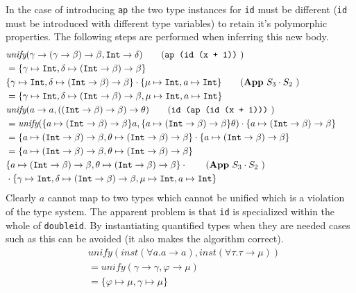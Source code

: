 \documentclass[11pt,oneside,a4paper]{report}
\begin{document}
\begin{exmp}
    In the case of introducing \texttt{ap} the two type instances for \texttt{id} must be different (\texttt{id} must be introduced with different type variables) to retain it's polymorphic properties.
    The following steps are performed when inferring this new body.
\begin{align}
    &\textit{unify}(\gamma \rightarrow (\gamma \rightarrow \beta) \rightarrow \beta, \texttt{Int} \rightarrow \delta) \tag{\texttt{ap (id (x + 1))} }\\
    & = \{ \gamma \mapsto \texttt{Int}, \delta \mapsto (\texttt{Int} \rightarrow \beta) \rightarrow \beta \} \tag*{}\\
    &\{ \gamma \mapsto \texttt{Int}, \delta \mapsto (\texttt{Int} \rightarrow \beta) \rightarrow \beta \} \cdot \{ \mu \mapsto \texttt{Int}, a \mapsto \texttt{Int} \} \tag{\textbf{App} $S_3 \cdot S_2$ }\\
    & = \{ \gamma \mapsto \texttt{Int}, \delta \mapsto (\texttt{Int} \rightarrow \beta) \rightarrow \beta, \mu \mapsto \texttt{Int}, a \mapsto \texttt{Int} \} \tag*{}\\
    &\textit{unify}(a \rightarrow a, ((\texttt{Int} \rightarrow \beta) \rightarrow \beta) \rightarrow \theta) \tag{\texttt{id (ap (id (x + 1)))} }\\
    &= \textit{unify}(
     \{ a \mapsto  (\texttt{Int} \rightarrow \beta) \rightarrow \beta \} a,
     \{ a \mapsto  (\texttt{Int} \rightarrow \beta) \rightarrow \beta\} \theta
    ) \cdot \{ a \mapsto  (\texttt{Int} \rightarrow \beta) \rightarrow \beta\} \tag*{}\\
    &= \{ a \mapsto (\texttt{Int} \rightarrow \beta) \rightarrow \beta, \theta \mapsto (\texttt{Int} \rightarrow \beta) \rightarrow \beta \} \cdot \{ a \mapsto (\texttt{Int} \rightarrow \beta) \rightarrow \beta\} \tag*{}\\
    &= \{ a \mapsto (\texttt{Int} \rightarrow \beta) \rightarrow \beta, \theta \mapsto (\texttt{Int} \rightarrow \beta) \rightarrow \beta \} \tag*{}\\
    &\{ a \mapsto (\texttt{Int} \rightarrow \beta) \rightarrow \beta, \theta \mapsto (\texttt{Int} \rightarrow \beta) \rightarrow \beta \} \cdot \tag{\textbf{App} $S_3 \cdot S_2$ }\\
    &\cdot \{ \gamma \mapsto \texttt{Int}, \delta \mapsto (\texttt{Int} \rightarrow \beta) \rightarrow \beta, \mu \mapsto \texttt{Int}, a \mapsto \texttt{Int} \} \tag*{}
\end{align}
    Clearly $a$ cannot map to two types which cannot be unified which is a violation of the type system.
    The apparent problem is that \texttt{id} is specialized within the whole of \texttt{doubleid}.
    By instantiating quantified types when they are needed cases such as this can be avoided (it also makes the algorithm correct).
    \begin{align}
        &\textit{unify}(\textit{inst}(\forall a . a \rightarrow a), \textit{inst}(\forall \tau . \tau \rightarrow \mu))\\
        & = \textit{unify}(\gamma \rightarrow \gamma, \varphi \rightarrow \mu) \tag*{}\\
        & = \{ \varphi \mapsto \mu, \gamma \mapsto \mu \} \tag*{}
    \end{align}
\end{exmp}
\end{document}
